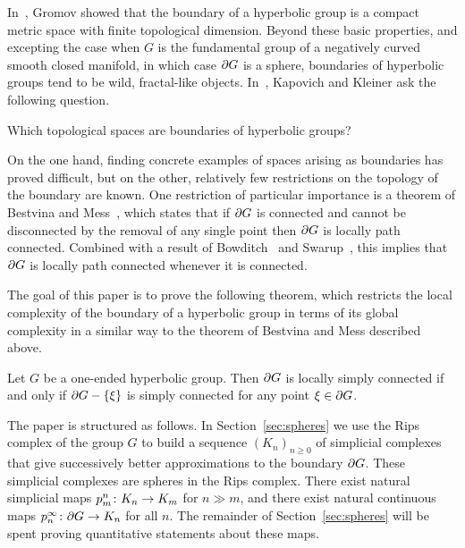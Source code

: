 \documentclass[a4paper]{article}
\begin{document}
In~\cite{gromov87}, Gromov showed that the boundary of a hyperbolic group is a
compact metric space with finite topological dimension. Beyond these basic
properties, and excepting the case when $G$ is the fundamental group of a
negatively curved smooth closed manifold, in which case $\partial G$ is a
sphere, boundaries of hyperbolic groups tend to be wild, fractal-like objects.
In~\cite{kapovichkleiner00}, Kapovich and Kleiner ask the following question.


\begin{question}\cite[Question A]{kapovichkleiner00}
  Which topological spaces are boundaries of hyperbolic groups?
\end{question}

On the one hand, finding concrete examples of spaces arising as boundaries has
proved difficult, but on the other, relatively few restrictions on the topology
of the boundary are known. One restriction of particular importance is a
theorem of Bestvina and Mess~\cite{bestvinamess91}, which states that if
$\partial G$ is connected and cannot be disconnected by the removal of any
single point then $\partial G$ is locally path connected. Combined with a
result of Bowditch~\cite{bowditch98b} and Swarup~\cite{swarup96}, this implies
that $\partial G$ is locally path connected whenever it is connected.

The goal of this paper is to prove the following theorem, which restricts the
local complexity of the boundary of a hyperbolic group in terms of its global
complexity in a similar way to the theorem of Bestvina and Mess described
above.


\begin{theorem}\label{thm:main_theorem}
  Let $G$ be a one-ended hyperbolic group. Then $\partial G$ is locally simply
  connected if and only if $\partial G - \left\{\xi\right\}$ is simply connected for any
  point $\xi \in \partial G$.
\end{theorem}

The paper is structured as follows. In Section~\ref{sec:spheres} we use the
Rips complex of the group $G$ to build a sequence $(K_n)_{n \geq 0}$ of
simplicial complexes that give successively better approximations to the
boundary $\partial G$. These simplicial complexes are spheres in the Rips
complex. There exist natural simplicial maps $p^n_m\colon K_n\to K_m$ for $n \gg
m$, and there exist natural continuous maps $p^\infty_n\colon\partial G \to
K_n$ for all $n$.  The remainder of Section~\ref{sec:spheres} will be spent
proving quantitative statements about these maps.
\end{document}

